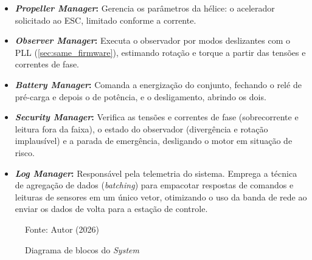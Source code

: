 \begin{itemize}
    \item \textbf{\textit{Propeller Manager}:} Gerencia os parâmetros da hélice: o acelerador solicitado ao ESC, limitado conforme a corrente.
    \item \textbf{\textit{Observer Manager}:} Executa o observador por modos deslizantes com o PLL (\autoref{sec:same_firmware}), estimando rotação e torque a partir das tensões e correntes de fase.
    \item \textbf{\textit{Battery Manager}:} Comanda a energização do conjunto, fechando o relé de pré-carga e depois o de potência, e o desligamento, abrindo os dois.
    \item \textbf{\textit{Security Manager}:} Verifica as tensões e correntes de fase (sobrecorrente e leitura fora da faixa), o estado do observador (divergência e rotação implausível) e a parada de emergência, desligando o motor em situação de risco.
    \item \textbf{\textit{Log Manager}:} Responsável pela telemetria do sistema. Emprega a técnica de agregação de dados (\textit{batching}) para empacotar respostas de comandos e leituras de sensores em um único vetor, otimizando o uso da banda de rede ao enviar os dados de volta para a estação de controle.
\end{itemize}

\begin{figure}[H]
    \centering
    \caption{Diagrama de blocos do \textit{System}}
    \label{fig:Metodologia_SystemManager_Siba}

    Fonte: Autor (2026)
\end{figure}

